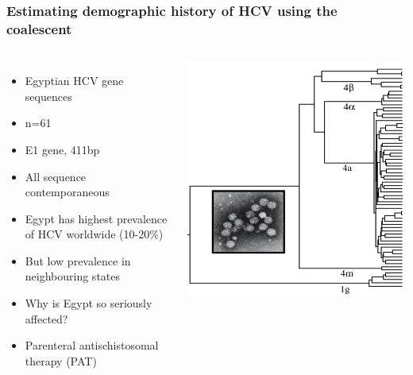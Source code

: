 \begin{frame}
\frametitle{Estimating demographic history of HCV using the coalescent}

\begin{columns}[t]


\scriptsize{
\begin{itemize}
	\item Egyptian HCV gene sequences
	\item n=61
	\item E1 gene, 411bp
	\item All sequence contemporaneous
	\item Egypt has highest prevalence of HCV worldwide (10-20\%)
	\item But low prevalence in neighbouring states
	\item Why is Egypt so seriously affected?
	\item Parenteral antischistosomal therapy (PAT)
\end{itemize}
}


\includegraphics[width=\textwidth]{../../images/HistoryOfHCV}

\end{columns}

\end{frame}
